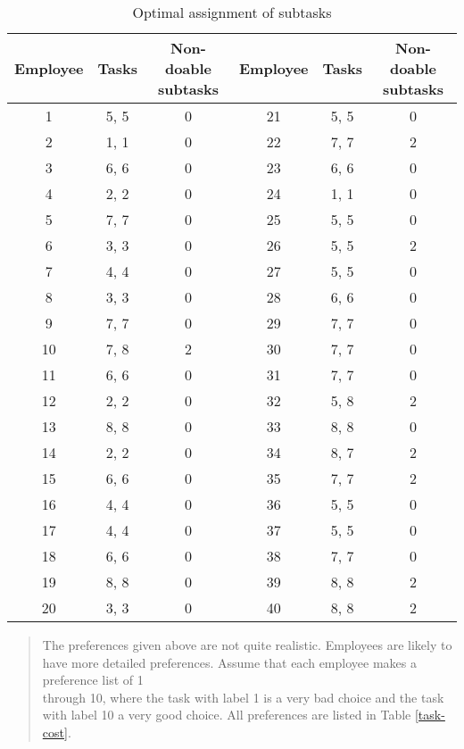 \begin{enumerate}[(a)]
\begin{table}[H]
	\centering
	\caption{Optimal assignment of subtasks}
	\begin{tabular}{ccc||ccc}\hline
Employee & Tasks & Non-doable subtasks & Employee & Tasks & Non-doable subtasks \\ \hline
1 & 5, 5 & 0 & 21 & 5, 5 & 0 \\
2 & 1, 1 & 0 & 22 & 7, 7 & 2 \\
3 & 6, 6 & 0 & 23 & 6, 6 & 0 \\
4 & 2, 2 & 0 & 24 & 1, 1 & 0 \\
5 & 7, 7 & 0 & 25 & 5, 5 & 0 \\
6 & 3, 3 & 0 & 26 & 5, 5 & 2 \\
7 & 4, 4 & 0 & 27 & 5, 5 & 0 \\
8 & 3, 3 & 0 & 28 & 6, 6 & 0 \\
9 & 7, 7 & 0 & 29 & 7, 7 & 0 \\
10 & 7, 8 & 2 & 30 & 7, 7 & 0 \\
11 & 6, 6 & 0 & 31 & 7, 7 & 0 \\
12 & 2, 2 & 0 & 32 & 5, 8 & 2 \\
13 & 8, 8 & 0 & 33 & 8, 8 & 0 \\
14 & 2, 2 & 0 & 34 & 8, 7 & 2 \\
15 & 6, 6 & 0 & 35 & 7, 7 & 2 \\
16 & 4, 4 & 0 & 36 & 5, 5 & 0 \\
17 & 4, 4 & 0 & 37 & 5, 5 & 0 \\
18 & 6, 6 & 0 & 38 & 7, 7 & 0 \\
19 & 8, 8 & 0 & 39 & 8, 8 & 2 \\
20 & 3, 3 & 0 & 40 & 8, 8 & 2 \\
\hline
	\end{tabular}
	\label{hungarian-3-c}
\end{table}

\begin{quote}The preferences given above are not quite realistic. Employees are likely to have
more detailed preferences. Assume that each employee makes a preference list of 1 \\ 
through 10, where the task with label 1 is a very bad choice and the task with label
10 a very good choice. All preferences are listed in Table \ref{task-cost}.\end{quote}


\end{enumerate}
